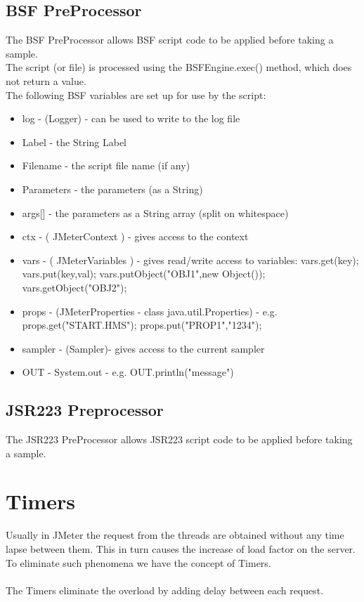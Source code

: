 \documentclass[12pt]{book}
\begin{document}
  \subsection{BSF PreProcessor}
  The BSF PreProcessor allows BSF script code to be applied before taking a sample. \\
  The script (or file) is processed using the BSFEngine.exec() method, which does not return a value.\\
  The following BSF variables are set up for use by the script: 
  \begin{itemize}
   \item  log - (Logger) - can be used to write to the log file 
   \item Label - the String Label 
   \item Filename - the script file name (if any) 
   \item Parameters - the parameters (as a String) 
   \item args[] - the parameters as a String array (split on whitespace) 
   \item ctx - ( JMeterContext ) - gives access to the context 
   \item vars - ( JMeterVariables ) - gives read/write access to variables: vars.get(key); vars.put(key,val); vars.putObject("OBJ1",new Object()); vars.getObject("OBJ2"); 
   \item props - (JMeterProperties - class java.util.Properties) - e.g. props.get("START.HMS"); props.put("PROP1","1234"); 
   \item sampler - (Sampler)- gives access to the current sampler 
   \item OUT - System.out - e.g. OUT.println("message") 
  \end{itemize}
  
  \subsection{JSR223 Preprocessor}
  The JSR223 PreProcessor allows JSR223 script code to be applied before taking a sample.
  
\section{Timers}
  Usually in JMeter the request from the threads are obtained without any time lapse between them. This in turn causes the increase of load factor on the server.
  To eliminate such phenomena we have the concept of Timers. \cite{Ehh} \cite{Jmeter}\cite{Manual}\\
  \\
  The Timers eliminate the overload by adding delay between each request.
\end{document}
